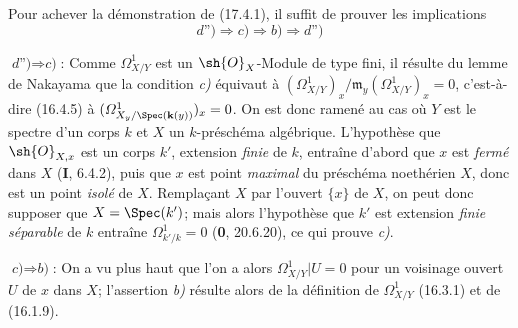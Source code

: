 Pour achever la démonstration de (17.4.1), il suffit de prouver les implications
\[
\textit{d'')}\Rightarrow\textit{c)}\Rightarrow\textit{b)}\Rightarrow\textit{d'')}
\]

$\textit{d'')}\Rightarrow\textit{c)}$: Comme $\varOmega^1_{X/Y}$ est un $\sh{O}_X$-Module de type fini, il résulte du lemme de Nakayama que la condition \emph{c)} équivaut à $(\varOmega^1_{X/Y})_x/\mathfrak{m}_y(\varOmega^1_{X/Y})_x=0$, c'est-à-dire (16.4.5) à $(\varOmega^1_{X_y/\Spec(\mathbf{k}(y))})_x=0$. On est donc ramené au cas où $Y$ est le spectre d'un corps $k$ et $X$ un $k$-préschéma algébrique. L'hypothèse que $\sh{O}_{X,x}$ est un corps $k'$, extension \emph{finie} de $k$, entraîne d'abord que $x$ est \emph{fermé} dans $X$ (\textbf{I}, 6.4.2), puis que $x$ est point \emph{maximal} du préschéma noethérien $X$, donc est un point \emph{isolé} de $X$. Remplaçant $X$ par l'ouvert $\{x\}$ de $X$, on peut donc supposer que $X=\Spec(k')$; mais alors l'hypothèse que $k'$ est extension \emph{finie séparable} de $k$ entraîne $\Omega^1_{k'/k}=0$ (\textbf{0}, 20.6.20), ce qui prouve \emph{c)}.

$\textit{c)}\Rightarrow\textit{b)}$: On a vu plus haut que l'on a alors $\varOmega^1_{X/Y}|U=0$ pour un voisinage ouvert $U$ de $x$ dans $X$; l'assertion \emph{b)} résulte alors de la définition de $\varOmega^1_{X/Y}$ (16.3.1) et de (16.1.9).

